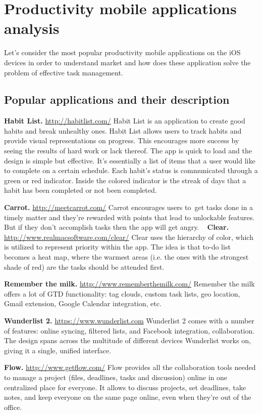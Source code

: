 \chapter{Productivity mobile applications analysis}
\label{chap:apps}
Let's consider the most popular productivity mobile applications on the iOS devices in order to understand market and how does these application solve the problem of effective task management.

\section{Popular applications and their description}

\textbf{Habit List.} \url{http://habitlist.com/} Habit List is an application to create good habits and break unhealthy ones. Habit List allows users to track habits and provide visual representations on progress. This encourages more success by seeing the results of hard work or lack thereof. The app is quick to load and the design is simple but effective. It’s essentially a list of items that a user would like to complete on a certain schedule. Each habit’s status is communicated through a green or red indicator. Inside the colored indicator is the streak of days that a habit has been completed or not been completed.

\textbf{Carrot.} \url{http://meetcarrot.com/} Carrot encourages users to get tasks done in a timely matter and they're rewarded with points that lead to unlockable features. But if they don't accomplish tasks then the app will get angry.
 
\textbf{Clear.} \url{http://www.realmacsoftware.com/clear/} Clear uses the hierarchy of color, which is utilized to represent priority within the app. The idea is that to-do list becomes a heat map, where the warmest areas (i.e. the ones with the strongest shade of red) are the tasks should be attended first.

\textbf{Remember the milk.} \url{http://www.rememberthemilk.com/} Remember the milk offers a lot of GTD functionality: tag clouds, custom task lists, geo location, Gmail extension, Google Calendar integration, etc.

\textbf{Wunderlist 2.} \url{https://www.wunderlist.com} Wunderlist 2 comes with a number of features: online syncing, filtered lists, and Facebook integration, collaboration. The design spans across the multitude of different devices Wunderlist works on, giving it a single, unified interface.

\textbf{Flow.} \url{http://www.getflow.com/} Flow provides all the collaboration tools needed to manage a project (files, deadlines, tasks and discussion) online in one centralized place for everyone. It allows to discuss projects, set deadlines, take notes, and keep everyone on the same page online, even when they're out of the office.

